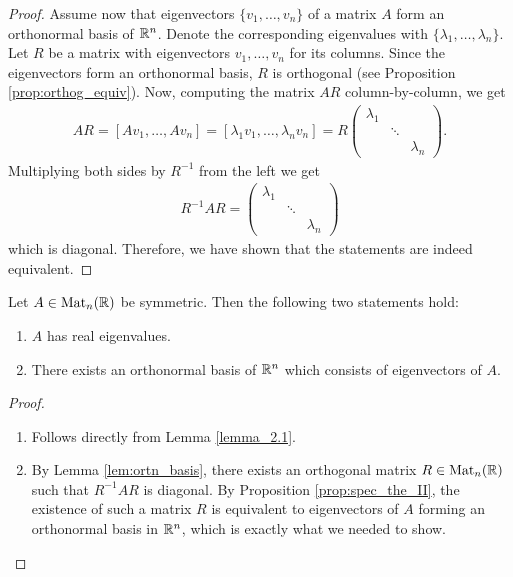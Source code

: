 \begin{proof}
    Assume now that eigenvectors $\{v_1,\dots, v_n\}$ of a matrix $A$ form an orthonormal basis of $\mathbb{R}^n$. Denote the corresponding eigenvalues with $\{\lambda_1, \dots, \lambda_n\}$. Let $R$ be a matrix with eigenvectors $v_1, \dots, v_n$ for its columns. Since the eigenvectors form an orthonormal basis, $R$ is orthogonal (see Proposition \ref{prop:orthog_equiv}). Now, computing the matrix $AR$ column-by-column, we get 
    \begin{gather*}
        AR = [Av_1,\dots, Av_n] = [\lambda_1 v_1, \dots, \lambda_n v_n] = R
        \begin{pmatrix}
            \lambda_{1} & & \\
            & \ddots & \\
            & & \lambda_{n}
        \end{pmatrix}.
    \end{gather*}
    Multiplying both sides by $R^{-1}$ from the left we get
    \begin{gather*}
        R^{-1}AR = \begin{pmatrix}
            \lambda_{1} & & \\
            & \ddots & \\
            & & \lambda_{n}
        \end{pmatrix}
    \end{gather*}
    which is diagonal. Therefore, we have shown that the statements are indeed equivalent.
\end{proof}

\begin{theorem}\label{thm:spectral}
    Let $A\in \text{Mat}_n(\mathbb{R})$ be symmetric. Then the following two statements hold:
    \begin{enumerate}
        \renewcommand{\labelenumi}{\arabic{enumi}.}
        \item $A$ has real eigenvalues.
        \item There exists an orthonormal basis of $\mathbb{R}^n$ which consists of eigenvectors of $A$.
    \end{enumerate}
\end{theorem}
\begin{proof}
    \begin{enumerate}
        \renewcommand{\labelenumi}{\arabic{enumi}.}
        \item Follows directly from Lemma \ref{lemma_2.1}.
        \item By Lemma \ref{lem:ortn_basis}, there exists an orthogonal matrix $R\in\text{Mat}_n(\mathbb{R})$ such that $R^{-1}AR$ is diagonal. By Proposition \ref{prop:spec_the_II}, the existence of such a matrix $R$ is equivalent to eigenvectors of $A$ forming an orthonormal basis in $\mathbb{R}^n$, which is exactly what we needed to show.
    \end{enumerate}
\end{proof}